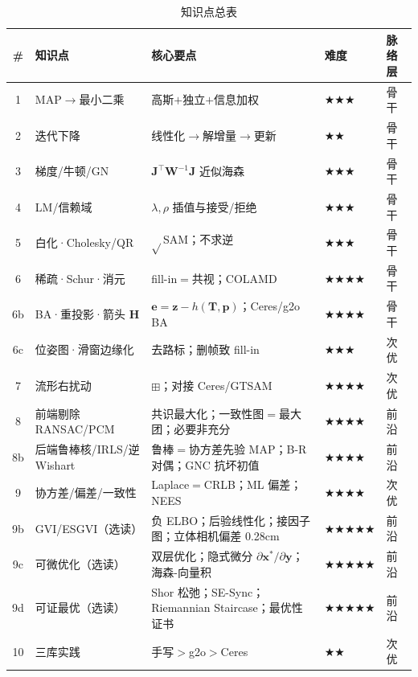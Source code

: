 \begin{table}[H]\centering\small
\caption{知识点总表}
\begin{tabular}{cllll}
\toprule
\# & 知识点 & 核心要点 & 难度 & 脉络层 \\
\midrule
1 & MAP$\to$最小二乘 & 高斯$+$独立$+$信息加权 & \(\bigstar\bigstar\bigstar\) & 骨干 \\
2 & 迭代下降 & 线性化$\to$解增量$\to$更新 & \(\bigstar\bigstar\) & 骨干 \\
3 & 梯度/牛顿/GN & $\mathbf{J}^\top\mathbf{W}^{-1}\mathbf{J}$ 近似海森 & \(\bigstar\bigstar\bigstar\) & 骨干 \\
4 & LM/信赖域 & $\lambda,\rho$ 插值与接受/拒绝 & \(\bigstar\bigstar\bigstar\) & 骨干 \\
5 & 白化·Cholesky/QR & $\sqrt{}$SAM；不求逆 & \(\bigstar\bigstar\bigstar\) & 骨干 \\
6 & 稀疏·Schur·消元 & fill-in$=$共视；COLAMD & \(\bigstar\bigstar\bigstar\bigstar\) & 骨干 \\
6b & BA·重投影·箭头 $\mathbf{H}$ & $\mathbf{e}=\mathbf{z}-h(\mathbf{T},\mathbf{p})$；Ceres/g2o BA & \(\bigstar\bigstar\bigstar\bigstar\) & 骨干 \\
6c & 位姿图·滑窗边缘化 & 去路标；删帧致 fill-in & \(\bigstar\bigstar\bigstar\) & 次优 \\
7 & 流形右扰动 & $\boxplus$；对接 Ceres/GTSAM & \(\bigstar\bigstar\bigstar\bigstar\) & 次优 \\
8 & 前端剔除 RANSAC/PCM & 共识最大化；一致性图$=$最大团；必要非充分 & \(\bigstar\bigstar\bigstar\bigstar\) & 前沿 \\
8b & 后端鲁棒核/IRLS/逆 Wishart & 鲁棒$=$协方差先验 MAP；B-R 对偶；GNC 抗坏初值 & \(\bigstar\bigstar\bigstar\bigstar\) & 前沿 \\
9 & 协方差/偏差/一致性 & Laplace$=$CRLB；ML 偏差；NEES & \(\bigstar\bigstar\bigstar\bigstar\) & 次优 \\
9b & GVI/ESGVI（选读） & 负 ELBO；后验线性化；接因子图；立体相机偏差 0.28cm & \(\bigstar\bigstar\bigstar\bigstar\bigstar\) & 前沿 \\
9c & 可微优化（选读） & 双层优化；隐式微分 $\partial\mathbf{x}^*/\partial\mathbf{y}$；海森-向量积 & \(\bigstar\bigstar\bigstar\bigstar\bigstar\) & 前沿 \\
9d & 可证最优（选读） & Shor 松弛；SE-Sync；Riemannian Staircase；最优性证书 & \(\bigstar\bigstar\bigstar\bigstar\bigstar\) & 前沿 \\
10 & 三库实践 & 手写$>$g2o$>$Ceres & \(\bigstar\bigstar\) & 次优 \\
\bottomrule
\end{tabular}
\end{table}

